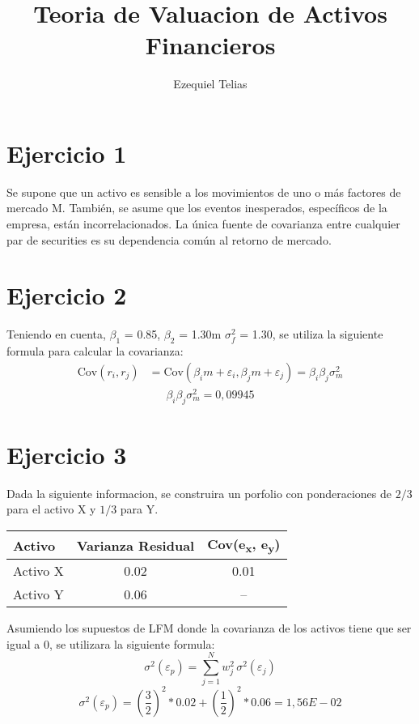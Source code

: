\documentclass{article}
\title{
    \textbf{Teoria de Valuacion de Activos Financieros} 
}
\author{Ezequiel Telias}
\date{}
\begin{document}
\maketitle

\section{Ejercicio 1}
Se supone que un activo es sensible a los movimientos de uno o más factores de mercado M. También, se asume que los eventos inesperados, específicos de la empresa, están incorrelacionados.
 La única fuente de covarianza entre cualquier par de securities es su dependencia común al retorno de mercado.


\section{Ejercicio 2}
 Teniendo en cuenta, $\beta_1$ = 0.85, $\beta_2$ = 1.30m $\sigma_f^2$ = 1.30, se utiliza la siguiente formula para calcular la covarianza:
 \[
\begin{aligned}
\mathrm{Cov}(r_i, r_j) &= \mathrm{Cov}(\beta_i m + \varepsilon_i, \beta_j m + \varepsilon_j) = \beta_i \beta_j \sigma_m^2
\end{aligned}
\]
\[
\begin{aligned}
\beta_i \beta_j \sigma_m^2 = 0,09945
\end{aligned}
\]

\section{Ejercicio 3}

Dada la siguiente informacion, se construira un porfolio con ponderaciones de $2/3$ para el activo X y $1/3$ para Y.
\begin{table}[h!]
\centering
\begin{tabular}{lcc}
\hline
\textbf{Activo} & \textbf{Varianza Residual} & \textbf{Cov}(e\textsubscript{x}, e\textsubscript{y}) \\
\hline
Activo X & 0.02 & 0.01 \\
Activo Y & 0.06 & -- \\
\hline
\end{tabular}
\end{table}

Asumiendo los supuestos de LFM donde la covarianza de los activos tiene que ser igual a 0, se utilizara la siguiente formula:
\[
\sigma^2(\varepsilon_p) = \sum_{j=1}^{N} w_j^2 \, \sigma^2(\varepsilon_j) 
\]
\[
\sigma^2(\varepsilon_p) = (\frac{3}{2})^2 * 0.02 + (\frac{1}{2})^2 * 0.06 = 1,56E-02
\]
\end{document}

